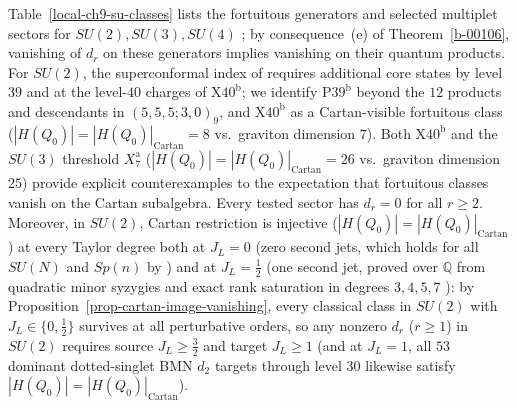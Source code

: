 \documentclass[11pt]{article}
\numberwithin{equation}{section}
\numberwithin{figure}{section}
\numberwithin{table}{section}
\newcommand{\HQ}{|H(Q_0)|}
\newcommand{\HQC}{|H(Q_0)|_{\mathrm{Cartan}}}
\begin{document}
Table~\ref{local-ch9-su-classes} lists the fortuitous generators and selected multiplet sectors for $SU(2),SU(3),SU(4)$ \cite[supplement, Sections S2.2--S2.3 and S8.2--S8.3]{Repo}; by consequence~(e) of Theorem~\ref{b-00106}, vanishing of $d_r$ on these generators implies vanishing on their quantum products. For $SU(2)$, the superconformal index of \cite[Section 3.2]{microstates} requires additional core states by level $39$ and at the level-$40$ charges of $\mathrm{X40}^{\mathrm{b}}$; we identify $\mathrm{P39}^{\mathrm{b}}$ beyond the $12$ products and descendants in $(5,5,5;3,0)_9$, and $\mathrm{X40}^{\mathrm{b}}$ as a Cartan-visible fortuitous class ($\HQ=\HQC=8$ vs.\ graviton dimension $7$). Both $\mathrm{X40}^{\mathrm{b}}$ and the $SU(3)$ threshold $X_7^{\mathrm{a}}$ ($\HQ=\HQC=26$ vs.\ graviton dimension $25$) provide explicit counterexamples to the expectation that fortuitous classes vanish on the Cartan subalgebra. Every tested sector has $d_r=0$ for all $r\ge2$. Moreover, in $SU(2)$, Cartan restriction is injective ($\HQ=\HQC$) at every Taylor degree both at $J_L=0$ (zero second jets, which holds for all $SU(N)$ and $Sp(n)$ by \cite{Vaccarino,ChenNgoSp}) and at $J_L=\tfrac12$ (one second jet, proved over $\mathbb Q$ from quadratic minor syzygies and exact rank saturation in degrees $3,4,5,7$ \cite{Repo}): by Proposition~\ref{prop-cartan-image-vanishing}, every classical class in $SU(2)$ with $J_L\in\{0,\tfrac12\}$ survives at all perturbative orders, so any nonzero $d_r$ ($r\ge1$) in $SU(2)$ requires source $J_L\ge\tfrac32$ and target $J_L\ge1$ (and at $J_L=1$, all $53$ dominant dotted-singlet BMN $d_2$ targets through level $30$ likewise satisfy $\HQ=\HQC$).
\end{document}
